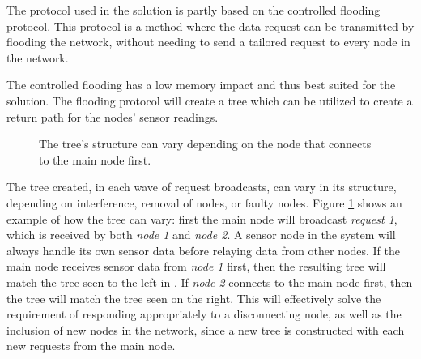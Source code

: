 The protocol used in the solution is partly based on the controlled flooding protocol.
This protocol is a method where the data request can be transmitted by flooding the network, without needing to send a tailored request to every node in the network. 

The controlled flooding has a low memory impact and thus best suited for the solution. The flooding protocol will create a tree which can be utilized to create a return path for the nodes' sensor readings.

\begin{figure}[h!]
	\centering
	\caption{The tree's structure can vary depending on the node that connects to the main node first.}
	\label{fig:treeVariation}
\end{figure}

The tree created, in each wave of request broadcasts, can vary in its structure, depending on interference, removal of nodes, or faulty nodes. Figure \ref{fig:treeVariation} shows an example of how the tree can vary: first the main node will broadcast \textit{request 1}, which is received by both \textit{node 1} and \textit{node 2}. A sensor node in the system will always handle its own sensor data before relaying data from other nodes. If the main node receives sensor data from \textit{node 1} first, then the resulting tree will match the tree seen to the left in . If \textit{node 2} connects to the main node first, then the tree will match the tree seen on the right.
This will effectively solve the requirement of responding appropriately to a disconnecting node, as well as the inclusion of new nodes in the network, since a new tree is constructed with each new requests from the main node.

